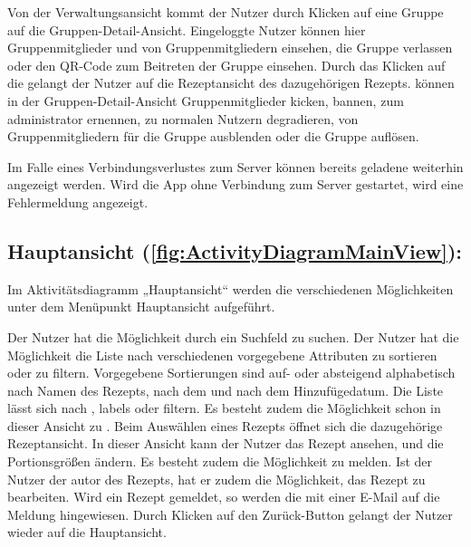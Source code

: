 \documentclass[parskip=full]{scrartcl}
\begin{document}
Von der Verwaltungsansicht kommt der Nutzer durch Klicken auf eine Gruppe auf die Gruppen-Detail-Ansicht.
Eingeloggte Nutzer können hier Gruppenmitglieder und  von Gruppenmitgliedern einsehen, die Gruppe verlassen oder den QR-Code zum Beitreten der Gruppe einsehen.
Durch das Klicken auf die  gelangt der Nutzer auf die Rezeptansicht des dazugehörigen Rezepts.
 können in der Gruppen-Detail-Ansicht Gruppenmitglieder \gls{kicken}, \gls{bannen}, zum \gls{administrator} ernennen,  zu normalen Nutzern degradieren,  von Gruppenmitgliedern für die Gruppe \gls{ausblenden} oder die Gruppe auflösen.\par

Im Falle eines Verbindungsverlustes zum Server können bereits geladene  weiterhin angezeigt werden. Wird die App ohne Verbindung zum Server gestartet, wird eine Fehlermeldung angezeigt.

\subsection{Hauptansicht (\autoref{fig:ActivityDiagramMainView}):}

Im Aktivitätsdiagramm „Hauptansicht“
werden die verschiedenen Möglichkeiten unter dem Menüpunkt Hauptansicht aufgeführt.


Der Nutzer hat die Möglichkeit  durch ein Suchfeld zu suchen.
Der Nutzer hat die Möglichkeit die Liste nach verschiedenen vorgegebene Attributen zu sortieren oder zu filtern.
Vorgegebene Sortierungen sind auf- oder absteigend alphabetisch nach Namen des Rezepts, nach dem  und nach dem Hinzufügedatum.
Die Liste lässt sich nach , \gls{labels} oder  filtern.
Es besteht zudem die Möglichkeit  schon in dieser Ansicht zu .\newline
Beim Auswählen eines Rezepts öffnet sich die dazugehörige Rezeptansicht.
In dieser Ansicht kann der Nutzer das Rezept ansehen,  und die Portionsgrößen ändern.
Es besteht zudem die Möglichkeit  zu melden.
Ist der Nutzer der \gls{autor} des Rezepts, hat er zudem die Möglichkeit, das Rezept zu bearbeiten.
Wird ein Rezept gemeldet, so werden die  mit einer E-Mail auf die Meldung hingewiesen.\newline
Durch Klicken auf den Zurück-Button gelangt der Nutzer wieder auf die Hauptansicht.\par
\end{document}
